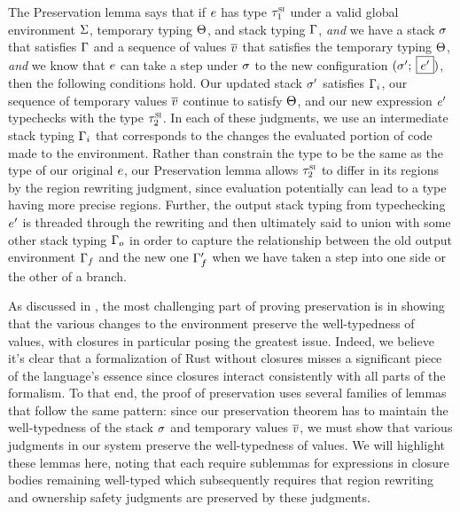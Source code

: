 The Preservation lemma says that if $e$ has type $\tau^\textsc{si}_1$ under a
valid global environment $\Sigma$, temporary typing $\Theta$, and
stack typing $\Gamma$, \emph{and} we have a stack $\sigma$ that satisfies
$\Gamma$ and a sequence of values $\overline{v}$ that satisfies the
temporary typing $\Theta$, \emph{and} we know that $e$ can take a step
under $\sigma$ to the new configuration
$(\sigma^\prime ; \: \fbox{$e^\prime$})$, then the following conditions hold.
Our updated stack $\sigma^\prime$ satisfies $\Gamma_i$, our sequence of
temporary values $\overline{v}$ continue to satisfy $\Theta$, and our
new expression $e^\prime$ typechecks with the type $\tau^\textsc{si}_2$. In each of
these judgments, we use an intermediate stack typing $\Gamma_i$ that
corresponds to the changes the evaluated portion of code made to the
environment. Rather than constrain the type to be the same as the type of our
original $e$, our Preservation lemma allows $\tau^\textsc{si}_2$ to differ in its
regions by the region rewriting judgment, since evaluation potentially can lead
to a type having more precise regions. Further, the output stack typing from
typechecking $e^\prime$ is threaded through the rewriting and then ultimately
said to union with some other stack typing $\Gamma_o$ in order to capture the
relationship between the old output environment $\Gamma_f$ and the new one
$\Gamma_f^\prime$ when we have taken a step into one side or the other of a
branch.

As discussed in , the most challenging part of proving
preservation is in showing that the various changes to the environment preserve
the well-typedness of values, with closures in particular posing the greatest
issue. Indeed, we believe it's clear that a formalization of Rust without
closures misses a significant piece of the language's essence since closures
interact consistently with all parts of the formalism. To that end, the
proof of preservation uses several families of lemmas that
follow the same pattern: since our preservation theorem has to maintain the
well-typedness of the stack $\sigma$ and temporary values
$\overline{v}$, we must show that various judgments in our system
preserve the well-typedness of values. We will highlight these lemmas here,
noting that each require sublemmas for expressions in closure bodies
remaining well-typed which subsequently requires that region rewriting and
ownership safety judgments are preserved by these judgments.

